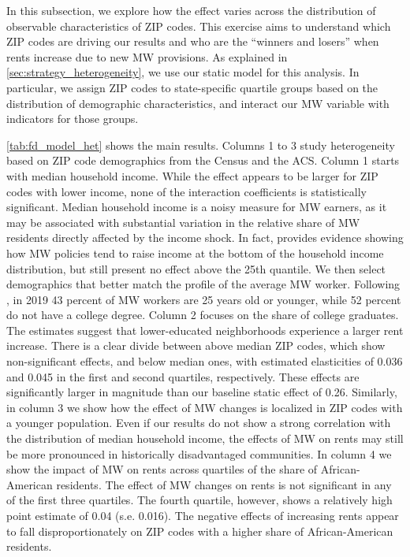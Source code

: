 In this subsection, we explore how the effect varies across the distribution of observable 
characteristics of ZIP codes. This exercise aims to understand which ZIP codes are driving 
our results and who are the ``winners and losers'' when rents increase due to new MW provisions. 
As explained in \autoref{sec:strategy_heterogeneity}, we use our static model for this analysis. 
In particular, we assign ZIP codes to state-specific quartile groups based on the distribution of 
demographic characteristics, and interact our MW variable with indicators for those groups. 

\autoref{tab:fd_model_het} shows the main results. Columns 1 to 3 study heterogeneity based on 
ZIP code demographics from the Census and the ACS. Column 1 starts with median household income. 
While the effect appears to be larger for ZIP codes with lower income, none of the interaction 
coefficients is statistically significant. Median household income is a noisy measure for MW 
earners, as it may be associated with substantial variation in the relative share of MW residents 
directly affected by the income shock. In fact, \textcite{dube2019minimum} provides evidence 
showing how MW policies tend to raise income at the bottom of the household income distribution, 
but still present no effect above the 25th quantile.
We then select demographics that better match the profile of the average MW worker. Following 
\textcite{MinWorkersReportBLS}, in 2019 43 percent of MW workers are 25 years old or younger, 
while 52 percent do not have a college degree. Column 2 focuses on the share of college 
graduates. The estimates suggest that lower-educated neighborhoods experience a larger rent 
increase. There is a clear divide between above median ZIP codes, which show non-significant 
effects, and below median ones, with estimated elasticities of 0.036 and 0.045 in the first and 
second quartiles, respectively. These effects are significantly larger in magnitude than our 
baseline static effect of 0.26. Similarly, in column 3 we show how the effect of MW changes 
is localized in ZIP codes with a younger population. Even if our results do not show a strong 
correlation with the distribution of median household income, the effects of MW on rents may 
still be more pronounced in historically disadvantaged communities. In column 4 we show the 
impact of MW on rents across quartiles of the share of African-American residents. The effect 
of MW changes on rents is not significant in any of the first three quartiles. The fourth 
quartile, however, shows a relatively high point estimate of 0.04 (s.e. 0.016). The negative 
effects of increasing rents appear to fall disproportionately on ZIP codes with a higher share 
of African-American residents. 

